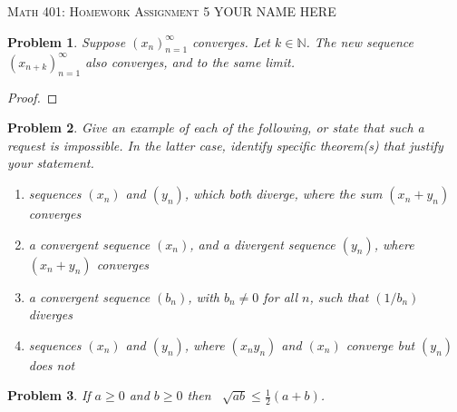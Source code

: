 \documentclass[12pt]{article}
\newtheorem{problem}{Problem}
\newcommand{\NN}{\ensuremath{\mathbb N}}
\begin{document}
\small
\noindent \textsc{Math 401: Homework Assignment 5} \hfill YOUR NAME HERE

\normalsize
\bigskip

\setcounter{problem}{28}

\begin{problem} %
Suppose $(x_n)_{n=1}^\infty$ converges.  Let $k \in \NN$.  The new sequence $(x_{n+k})_{n=1}^\infty$ also converges, and to the same limit.
\end{problem}


\begin{proof}
\end{proof}


\begin{problem} %
Give an example of each of the following, or state that such a request is impossible.  In the latter case, identify specific theorem(s) that justify your statement.

\renewcommand{\labelenumi}{(\alph{enumi})}
\begin{enumerate}
\item sequences $(x_n)$ and $(y_n)$, which both diverge, where the sum $(x_n+y_n)$ converges


\item a convergent sequence $(x_n)$, and a divergent sequence $(y_n)$, where $(x_n+y_n)$ converges


\item a convergent sequence $(b_n)$, with $b_n\ne 0$ for all $n$, such that $(1/b_n)$ diverges


\item sequences $(x_n)$ and $(y_n)$, where $(x_n y_n)$ and $(x_n)$ converge but $(y_n)$ does not


\end{enumerate}
\end{problem}


\begin{problem} %
If $a\ge 0$ and $b\ge 0$ then \, $\displaystyle \sqrt{ab} \le \frac{1}{2}\left(a+b\right)$.
\end{problem}
\end{document}
